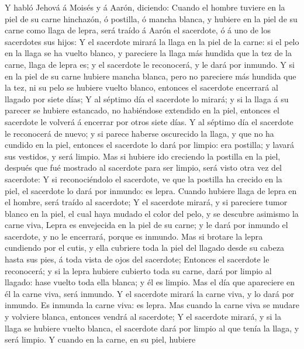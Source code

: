  Y habló Jehová á Moisés y á Aarón, diciendo: 
Cuando el hombre tuviere en la piel de su carne hinchazón, ó postilla, ó
mancha blanca, y hubiere en la piel de su carne como llaga de lepra,
será traído á Aarón el sacerdote, ó á uno de los sacerdotes sus hijos:
 Y el sacerdote mirará la llaga en la piel de la carne: si
el pelo en la llaga se ha vuelto blanco, y pareciere la llaga más
hundida que la tez de la carne, llaga de lepra es; y el sacerdote le
reconocerá, y le dará por inmundo.  Y si en la piel de su
carne hubiere mancha blanca, pero no pareciere más hundida que la tez,
ni su pelo se hubiere vuelto blanco, entonces el sacerdote encerrará al
llagado por siete días;  Y al séptimo día el sacerdote lo
mirará; y si la llaga á su parecer se hubiere estancado, no habiéndose
extendido en la piel, entonces el sacerdote le volverá á encerrar por
otros siete días.  Y al séptimo día el sacerdote le
reconocerá de nuevo; y si parece haberse oscurecido la llaga, y que no
ha cundido en la piel, entonces el sacerdote lo dará por limpio: era
postilla; y lavará sus vestidos, y será limpio.  Mas si
hubiere ido creciendo la postilla en la piel, después que fué mostrado
al sacerdote para ser limpio, será visto otra vez del sacerdote:
 Y si reconociéndolo el sacerdote, ve que la postilla ha
crecido en la piel, el sacerdote lo dará por inmundo: es lepra.
 Cuando hubiere llaga de lepra en el hombre, será traído al
sacerdote;  Y el sacerdote mirará, y si pareciere tumor
blanco en la piel, el cual haya mudado el color del pelo, y se descubre
asimismo la carne viva,  Lepra es envejecida en la piel de
su carne; y le dará por inmundo el sacerdote, y no le encerrará, porque
es inmundo.  Mas si brotare la lepra cundiendo por el
cutis, y ella cubriere toda la piel del llagado desde su cabeza hasta
sus pies, á toda vista de ojos del sacerdote;  Entonces el
sacerdote le reconocerá; y si la lepra hubiere cubierto toda su carne,
dará por limpio al llagado: hase vuelto toda ella blanca; y él es
limpio.  Mas el día que apareciere en él la carne viva,
será inmundo.  Y el sacerdote mirará la carne viva, y lo
dará por inmundo. Es inmunda la carne viva: es lepra.  Mas
cuando la carne viva se mudare y volviere blanca, entonces vendrá al
sacerdote;  Y el sacerdote mirará, y si la llaga se hubiere
vuelto blanca, el sacerdote dará por limpio al que tenía la llaga, y
será limpio.  Y cuando en la carne, en su piel, hubiere
